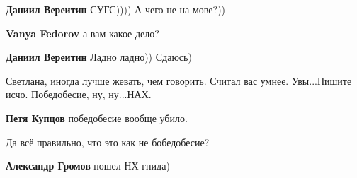 \begin{itemize}
\begin{itemize}
\textbf{Даниил Вереитин} СУГС)))) А чего не на мове?))

 
\textbf{Vanya Fedorov} а вам какое дело?

 
\textbf{Даниил Вереитин} Ладно ладно)) Сдаюсь)
\end{itemize}

 
Светлана, иногда лучше жевать, чем говорить. Считал вас умнее. Увы...Пишите исчо. Победобесие, ну, ну...НАХ.

\begin{itemize}
 
\textbf{Петя Купцов} победобесие вообще убило.

 
Да всё правильно, что это как не бобедобесие?

 
\textbf{Александр Громов} пошел НХ гнида)
\end{itemize}

 


\end{itemize}
